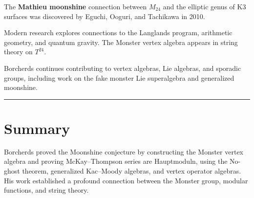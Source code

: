 The \textbf{Mathieu moonshine} connection between $M_{24}$ and the
elliptic genus of K3 surfaces was discovered by Eguchi, Ooguri, and
Tachikawa in 2010.

Modern research explores connections to the Langlands program,
arithmetic geometry, and quantum gravity.  The Monster vertex
algebra appears in string theory on $T^{24}$.

Borcherds continues contributing to vertex algebras, Lie algebras,
and sporadic groups, including work on the fake monster Lie
superalgebra and generalized moonshine.

\begin{center}\rule{0.5\linewidth}{0.5pt}\end{center}

\section*{Summary}

Borcherds proved the Moonshine conjecture by constructing the
Monster vertex algebra and proving McKay--Thompson series are
Hauptmoduln, using the No-ghost theorem, generalized Kac--Moody
algebras, and vertex operator algebras.  His work established a
profound connection between the Monster group, modular functions,
and string theory.

